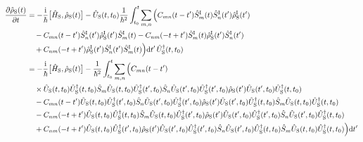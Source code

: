 \documentclass[9pt]{report}
\begin{document}
\begin{align}
\frac{\partial\hat{\rho}_{\mathrm{S}}(t)}{\partial t} &= -\frac{\mathrm{i}}{\hbar}\big[\hat{H}_{\mathrm{S}},\hat{\rho}_{\mathrm{S}}(t)\big]-\hat{U}_{\mathrm{S}}(t,t_0)\frac{1}{\hbar^2}\int_{t_0}^{t}\sum_{m,n}\Big(C_{mn}(t-t')\hat{S}_{m}^{\mathrm{I}}(t)\hat{S}_{n}^{\mathrm{I}}(t')\hat{\rho}_{\mathrm{S}}^{\mathrm{I}}(t')\\
& \quad-C_{mn}(t-t')\hat{S}_{n}^{\mathrm{I}}(t')\hat{\rho}_{\mathrm{S}}^{\mathrm{I}}(t')\hat{S}_{m}^{\mathrm{I}}(t) - C_{nm}(-t+t')\hat{S}_{m}^{\mathrm{I}}(t)\hat{\rho}_{\mathrm{S}}^{\mathrm{I}}(t')\hat{S}_{n}^{\mathrm{I}}(t')\notag\\
&\quad +C_{nm}(-t+t')\hat{\rho}_{\mathrm{S}}^{\mathrm{I}}(t')\hat{S}_{n}^{\mathrm{I}}(t')\hat{S}_{m}^{\mathrm{I}}(t)\Big)\mathrm{d}t'\,\hat{U}_{\mathrm{S}}^{\dagger}(t,t_0)\notag\\
&= -\frac{\mathrm{i}}{\hbar}\big[\hat{H}_{\mathrm{S}},\hat{\rho}_{\mathrm{S}}(t)\big] -\frac{1}{\hbar^2}\int_{t_0}^{t}\sum_{m,n}\Big(C_{mn}(t-t')\\
&\quad\times\hat{U}_{\mathrm{S}}(t,t_0)\hat{U}_{\mathrm{S}}^{\dagger}(t,t_0)\hat{S}_{m}\hat{U}_{\mathrm{S}}(t,t_0)\hat{U}_{\mathrm{S}}^{\dagger}(t',t_0)\hat{S}_{n}\hat{U}_{\mathrm{S}}(t',t_0)\hat{U}^{\dagger}_{\mathrm{S}}(t',t_0)\hat{\rho}_{\mathrm{S}}(t')\hat{U}_{\mathrm{S}}(t',t_0)\hat{U}_{\mathrm{S}}^{\dagger}(t,t_0)\notag\\
&\quad-C_{mn}(t-t')\hat{U}_{\mathrm{S}}(t,t_0)\hat{U}^{\dagger}_{\mathrm{S}}(t',t_0)\hat{S}_{n}\hat{U}_{\mathrm{S}}(t',t_0)\hat{U}_{\mathrm{S}}^{\dagger}(t',t_0)\hat{\rho}_{\mathrm{S}}(t')\hat{U}_{\mathrm{S}}(t',t_0)\hat{U}_{\mathrm{S}}^{\dagger}(t,t_0)\hat{S}_{m}\hat{U}_{\mathrm{S}}(t,t_0)\hat{U}_{\mathrm{S}}^{\dagger}(t,t_0)\notag\\
&\quad-C_{nm}(-t+t')\hat{U}_{\mathrm{S}}(t,t_0)\hat{U}_{\mathrm{S}}^{\dagger}(t,t_0)\hat{S}_{m}\hat{U}_{\mathrm{S}}(t,t_0)\hat{U}_{\mathrm{S}}^{\dagger}(t',t_0)\hat{\rho}_{\mathrm{S}}(t')\hat{U}_{\mathrm{S}}(t',t_0)\hat{U}_{\mathrm{S}}^{\dagger}(t',t_0)\hat{S}_{n}\hat{U}_{\mathrm{S}}(t',t_0)\hat{U}_{\mathrm{S}}^{\dagger}(t,t_0)\notag\\
&\quad+C_{nm}(-t+t')\hat{U}_{\mathrm{S}}(t,t_0)\hat{U}_{\mathrm{S}}^{\dagger}(t',t_0)\hat{\rho}_{\mathrm{S}}(t')\hat{U}_{\mathrm{S}}(t',t_0)\hat{U}_{\mathrm{S}}^{\dagger}(t',t_0)\hat{S}_{n}\hat{U}_{\mathrm{S}}(t',t_0)\hat{U}_{\mathrm{S}}^{\dagger}(t,t_0)\hat{S}_{m}\hat{U}_{\mathrm{S}}(t,t_0)\hat{U}_{\mathrm{S}}^{\dagger}(t,t_0)\Big)\mathrm{d}t'\notag\\

\end{align}
\end{document}
